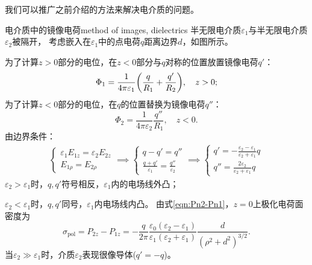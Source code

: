 我们可以推广之前介绍的方法来解决电介质的问题。
\begin{example}{电介质中的镜像电荷}{method of images, dielectrics}
    半无限电介质$\varepsilon_1$与半无限电介质$\varepsilon_2$被隔开，
    考虑嵌入在$\varepsilon_1$中的点电荷$q$距离边界$d$，如图所示。
    \begin{center}
    \end{center}
    为了计算$z>0$部分的电位，在$z<0$部分与$q$对称的位置放置镜像电荷$q'$：
    \[
        \Phi_1=\frac1{4\pi\varepsilon_1}\biggl(\frac q{R_1}+\frac{q'}{R_2}\biggr),\quad z>0;
    \]
    为了计算$z<0$部分的电位，在$q$的位置替换为镜像电荷$q''$：
    \[
        \Phi_2=\frac1{4\pi\varepsilon_2}\frac{q''}{R_1},\quad z<0.
    \]
    由边界条件： 
    \begin{align*}
        \begin{cases}
            \varepsilon_1E_{1z}=\varepsilon_2E_{2z}\\
            E_{1\rho}=E_{2\rho}
        \end{cases}\implies
        \begin{cases}
            q-q'=q''\\
            \frac{q+q'}{\varepsilon_1}=\frac{q''}{\varepsilon_2}
        \end{cases}\implies
        \begin{cases}
            q'=-\frac{\varepsilon_2-\varepsilon_1}{\varepsilon_2+\varepsilon_1}q\\[1ex]
            q''=\frac{2\varepsilon_2}{\varepsilon_2+\varepsilon_1}q
        \end{cases}
    \end{align*}
    $\varepsilon_2>\varepsilon_1$时，$q,q'$符号相反，$\varepsilon_1$内的电场线外凸；
    
    $\varepsilon_2<\varepsilon_1$时，$q,q'$同号，$\varepsilon_1$内电场线内凸。
    \tcblower 
    由式\eqref{eqn:Pn2-Pn1}，$z=0$上极化电荷面密度为
    \[
        \sigma_\text{pol}=P_{2z}-P_{1z}=-\frac q{2\pi}\frac{\varepsilon_0(\varepsilon_2-\varepsilon_1)}{\varepsilon_1(\varepsilon_2+\varepsilon_1)}\frac d{(\rho^2+d^2)^{3/2}}.
    \]
    当$\varepsilon_2\gg\varepsilon_1$时，介质$\varepsilon_2$表现很像导体($q'=-q$)。
\end{example}
